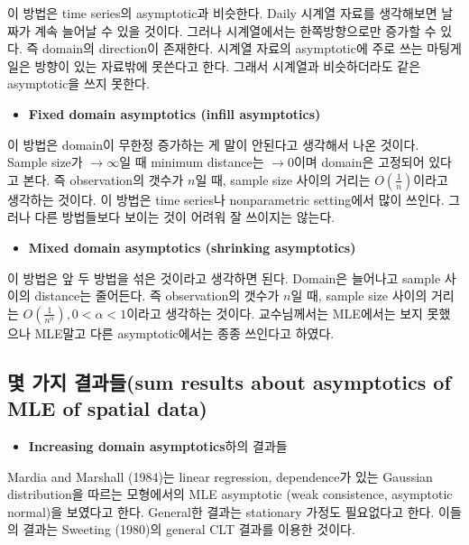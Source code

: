 \documentclass[b5paper,]{scrbook}
\providecommand{\tightlist}{%
  \setlength{\itemsep}{0pt}\setlength{\parskip}{0pt}}
\theoremstyle{plain}
\theoremstyle{definition}
\numberwithin{equation}{section}
\begin{document}
이 방법은 time series의 asymptotic과 비슷한다. Daily 시계열 자료를 생각해보면 날짜가 계속 늘어날 수 있을 것이다. 그러나 시계열에서는 한쪽방향으로만 증가할 수 있다. 즉 domain의 direction이 존재한다. 시계열 자료의 asymptotic에 주로 쓰는 마팅게일은 방향이 있는 자료밖에 못쓴다고 한다. 그래서 시계열과 비슷하더라도 같은 asymptotic을 쓰지 못한다.

\begin{itemize}
\tightlist
\item
  \textbf{Fixed domain asymptotics (infill asymptotics)}
\end{itemize}

이 방법은 domain이 무한정 증가하는 게 말이 안된다고 생각해서 나온 것이다. Sample size가 \(\rightarrow \infty\)일 때 minimum distance는 \(\rightarrow 0\)이며 domain은 고정되어 있다고 본다. 즉 observation의 갯수가 \(n\)일 때, sample size 사이의 거리는 \(O(\frac{1}{n})\)이라고 생각하는 것이다. 이 방법은 time series나 nonparametric setting에서 많이 쓰인다. 그러나 다른 방법들보다 보이는 것이 어려워 잘 쓰이지는 않는다.

\begin{itemize}
\tightlist
\item
  \textbf{Mixed domain asymptotics (shrinking asymptotics)}
\end{itemize}

이 방법은 앞 두 방법을 섞은 것이라고 생각하면 된다. Domain은 늘어나고 sample 사이의 distance는 줄어든다. 즉 observation의 갯수가 \(n\)일 때, sample size 사이의 거리는 \(O(\frac{1}{n^{\alpha}}), 0 <\alpha <1\)이라고 생각하는 것이다. 교수님께서는 MLE에서는 보지 못했으나 MLE말고 다른 asymptotic에서는 종종 쓰인다고 하였다.

\hypertarget{--sum-results-about-asymptotics-of-mle-of-spatial-data}{%
\subsection{몇 가지 결과들(sum results about asymptotics of MLE of spatial data)}\label{--sum-results-about-asymptotics-of-mle-of-spatial-data}}

\begin{itemize}
\tightlist
\item
  \textbf{Increasing domain asymptotics}하의 결과들
\end{itemize}

Mardia and Marshall (1984)는 linear regression, dependence가 있는 Gaussian distribution을 따르는 모형에서의 MLE asymptotic (weak consistence, asymptotic normal)을 보였다고 한다. General한 결과는 stationary 가정도 필요없다고 한다. 이들의 결과는 Sweeting (1980)의 general CLT 결과를 이용한 것이다.
\end{document}
